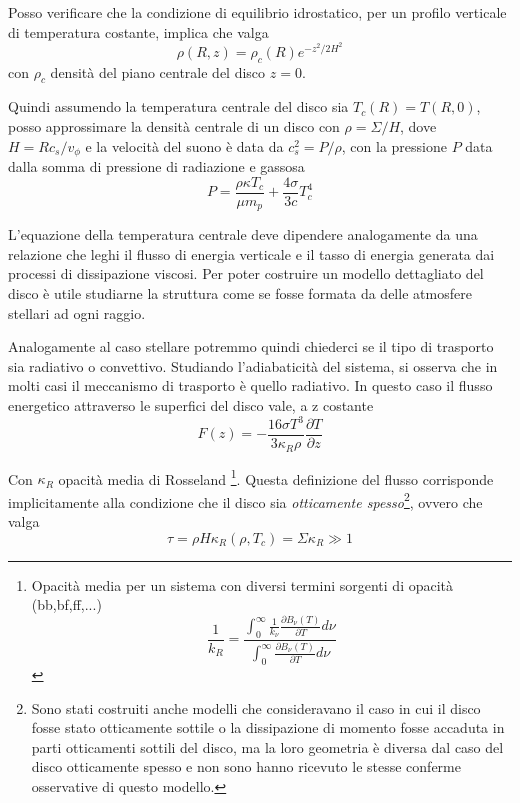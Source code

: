 \documentclass[a4paperbi]{article}
\begin{document}
	Posso verificare che la condizione di equilibrio idrostatico, per un profilo verticale di temperatura costante, implica che valga
	\begin{equation*}
		\rho(R,z)=\rho_c(R)e^{-z^2/2H^2}
	\end{equation*}
	con $\rho_c$ densità del piano centrale del disco $z=0$.
	
	Quindi assumendo la temperatura centrale del disco sia $T_c(R)=T(R,0)$, posso approssimare la densità centrale di un disco con $\rho=\Sigma/H$, dove $H=Rc_s/v_\phi$ e la velocità del suono è data da $c_s^2=P/\rho$, con la pressione $P$ data dalla somma di pressione di radiazione e gassosa
	\begin{equation}
		P=\frac{\rho\kappa T_c}{\mu m_p}+\frac{4\sigma}{3c}T_c^4
	\end{equation}
	
	L'equazione della temperatura centrale deve dipendere analogamente da una relazione che leghi il flusso di energia verticale e il tasso di energia generata dai processi di dissipazione viscosi. Per poter costruire un modello dettagliato del disco è utile studiarne la struttura come se fosse formata da delle atmosfere stellari ad ogni raggio. 
	
	Analogamente al caso stellare potremmo quindi chiederci se il tipo di trasporto sia  radiativo o convettivo. Studiando l'adiabaticità del sistema, si osserva che in molti casi il meccanismo di trasporto è quello radiativo. In questo caso il flusso energetico attraverso le superfici del disco vale, a z costante
	\begin{equation}
		F(z)=-\frac{16\sigma T^3}{3\kappa_R\rho}\frac{\partial T}{\partial z}
	\end{equation}
	
	Con $\kappa_R$ opacità media di Rosseland
	\footnote{Opacità media per un sistema con diversi termini sorgenti di opacità (bb,bf,ff,...)\begin{equation}
																							\frac{1}{k_R}=\frac{\int_0^\infty\frac{1}{k_\nu}\frac{\partial B_\nu(T)}{\partial T}d\nu}{\int_0^\infty\frac{\partial B_\nu(T)}{\partial T}d\nu}
																						\end{equation}}.
Questa definizione del flusso corrisponde implicitamente alla condizione che il disco sia \textit{otticamente spesso}\footnote{Sono stati costruiti anche modelli che consideravano il caso in cui il disco fosse stato otticamente sottile o la dissipazione di momento fosse accaduta in parti otticamenti sottili del disco, ma la loro geometria è diversa dal caso del disco otticamente spesso e non sono hanno ricevuto le stesse conferme osservative di questo modello.}, ovvero che valga
	\begin{equation}
		\tau=\rho H\kappa_R(\rho,T_c)=\Sigma\kappa_R\gg 1
	\end{equation}
	
\end{document}

